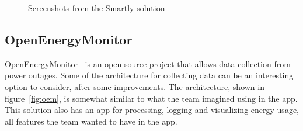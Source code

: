 \begin{figure}[H]
\label{fig:smartly}
  \centering
\quad
\caption{Screenshots from the Smartly solution}
\end{figure}
\newpage


\subsection{OpenEnergyMonitor}
\label{sec:openenergymonitor}
OpenEnergyMonitor~\cite{openenergymonitor} is an open source project that allows data collection from power outages. Some of the architecture for collecting data can be an interesting option to consider, after some improvements. The architecture, shown in figure~\ref{fig:oem}, is somewhat similar to what the team imagined using in the app. This solution also has an app for processing, logging and visualizing energy usage, all features the team wanted to have in the app.

